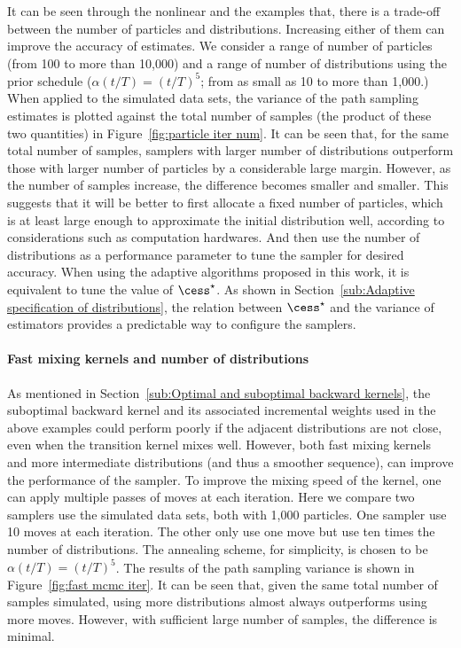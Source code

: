 It can be seen through the nonlinear \ode and the \pet examples that, there is
a trade-off between the number of particles and distributions. Increasing
either of them can improve the accuracy of estimates. We consider a range of
number of particles (from 100 to more than 10,000) and a range of number of
distributions using the prior schedule ($\alpha(t/T) = (t/T)^5$; from as small
as 10 to more than 1,000.) When applied to the simulated data sets, the
variance of the path sampling estimates is plotted against the total number of
samples (the product of these two quantities) in Figure~\ref{fig:particle iter
  num}. It can be seen that, for the same total number of samples, samplers
with larger number of distributions outperform those with larger number of
particles by a considerable large margin. However, as the number of samples
increase, the difference becomes smaller and smaller. This suggests that it
will be better to first allocate a fixed number of particles, which is at
least large enough to approximate the initial distribution well, according to
considerations such as computation hardwares. And then use the number of
distributions as a performance parameter to tune the sampler for desired
accuracy. When using the adaptive algorithms proposed in this work, it is
equivalent to tune the value of $\cess^\star$. As shown in
Section~\ref{sub:Adaptive specification of distributions}, the relation
between $\cess^\star$ and the variance of estimators provides a predictable
way to configure the samplers.

\paragraph{Fast mixing \mcmc kernels and number of distributions}

As mentioned in Section~\ref{sub:Optimal and suboptimal backward kernels}, the
suboptimal backward kernel and its associated incremental weights used in the
above examples could perform poorly if the adjacent distributions are not
close, even when the transition kernel mixes well. However, both fast mixing
kernels and more intermediate distributions (and thus a smoother sequence),
can improve the performance of the sampler. To improve the mixing speed of the
kernel, one can apply multiple passes of \mcmc moves at each iteration. Here
we compare two samplers use the simulated data sets, both with 1,000 particles.
One sampler use 10 \mcmc moves at each iteration. The other only use one \mcmc
move but use ten times the number of distributions. The annealing scheme, for
simplicity, is chosen to be $\alpha(t/T) = (t/T)^5$. The results of the path
sampling variance is shown in Figure~\ref{fig:fast mcmc iter}. It can be seen
that, given the same total number of samples simulated, using more
distributions almost always outperforms using more \mcmc moves. However, with
sufficient large number of samples, the difference is minimal.

